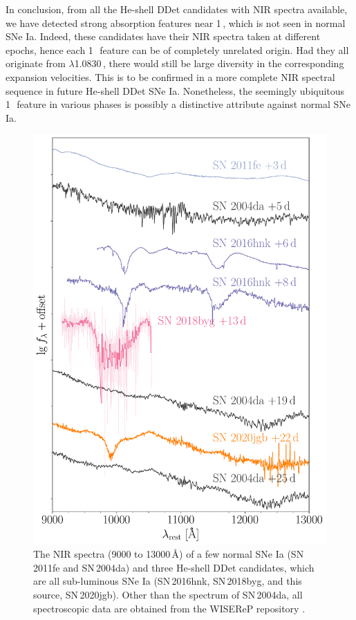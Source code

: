 \documentclass[twocolumn]{aastex631}
\newcommand{\sn}{SN\,2020jgb}
\begin{document}
In conclusion, from all the He-shell DDet candidates with NIR spectra available, we have detected strong absorption features near 1\,\micron, which is not seen in normal SNe Ia. Indeed, these candidates have their NIR spectra taken at different epochs, hence each 1\,\micron\ feature can be of completely unrelated origin. Had they all originate from  $\lambda$1.0830\,\micron, there would still be large diversity in the corresponding expansion velocities. This is to be confirmed in a more complete NIR spectral sequence in future He-shell DDet SNe Ia. Nonetheless, the seemingly ubiquitous 1\,\micron\ feature in various phases is possibly a distinctive attribute against normal SNe Ia.

\begin{figure}
    \centering
    \includegraphics[width=\linewidth]{NIR_spec_comp.pdf}
    \caption{The NIR spectra (9000 to 13000\,\r{A}) of a few normal SNe Ia (SN\,2011fe and SN\,2004da) and three He-shell DDet candidates, which are all sub-luminous SNe Ia (SN\,2016hnk, SN\,2018byg, and this source, \sn). Other than the spectrum of SN\,2004da, all spectroscopic data are obtained from the WISEReP repository \citep{wiserep_2012}.}
    \label{fig:NIR_comp}
\end{figure}
\end{document}
